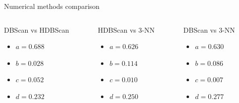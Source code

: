 \begin{frame}{Numerical methods comparison}
    \begin{columns}
        \begin{column}{0.22\paperwidth}
            \begin{block}{DBScan vs HDBScan}
                \begin{itemize}
                    \item $a=0.688$
                    \item $b=0.028$
                    \item $c=0.052$
                    \item $d=0.232$
                \end{itemize}
            \end{block}
        \end{column}
        \begin{column}{0.22\paperwidth}
            \begin{block}{HDBScan vs 3-NN}
                \begin{itemize}
                    \item $a=0.626$
                    \item $b=0.114$
                    \item $c=0.010$
                    \item $d=0.250$
                \end{itemize}
            \end{block}
        \end{column}
        \begin{column}{0.22\paperwidth}
            \begin{block}{DBScan vs 3-NN}
                \begin{itemize}
                    \item $a=0.630$
                    \item $b=0.086$
                    \item $c=0.007$
                    \item $d=0.277$
                \end{itemize}
            \end{block}
        \end{column}
    \end{columns}
\end{frame}